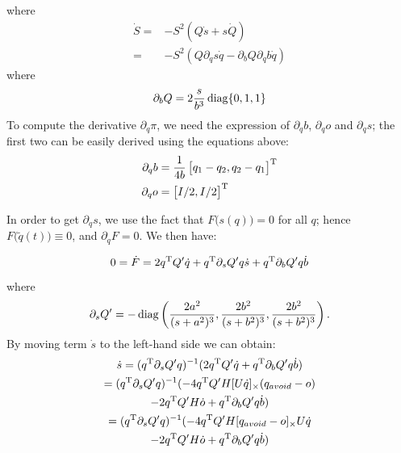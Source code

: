 \documentclass[journal]{IEEEtran}  %
\begin{document}
    where
    \begin{equation}\label{equ:S_dot}
      \begin{split}
        \dot S  =& - S^2 (Q \dot s + s \dot Q)\\
        =& - S^2 (Q \partial_q s \dot q - \partial_b Q \partial_q b \dot q)
      \end{split}
    \end{equation}
    where
    \begin{equation}
      \partial_b Q = 2\frac{s}{b^3} \operatorname{diag}\{0,1,1\}
    \end{equation}
    To compute the derivative $\partial_q \pi$, we need the expression of $\partial_q b$, $\partial_q o$ and $\partial_q s$; the first two can be easily derived using the equations above:
    \begin{align}
      \partial_q b &= \frac{1}{4b}\begin{bmatrix}q_1-q_2,q_2-q_1\end{bmatrix}^\mathrm{T}\\
      \partial_q o &= \begin{bmatrix}I/2,I/2\end{bmatrix}^\mathrm{T}
    \end{align}

    In order to get $\partial_q s$, we use the fact that $F\bigl(s(q)\bigr)=0$ for all $q$; hence $F\bigl(\tilde{q}(t)\bigr)\equiv 0$, and $\partial_q F = 0$. We then have:

    \begin{equation}
      0=\dot F =  2q^\mathrm{T} Q' \dot q + q^\mathrm{T} \partial_s Q' q \dot s + q^\mathrm{T} \partial_bQ' q \dot b
    \end{equation}
    where
    \begin{equation}
      \partial_s Q'= -\operatorname{diag}\left(\frac{2a^2}{(s+a^2)^3},\frac{2b^2}{(s+b^2)^3},\frac{2b^2}{(s+b^2)^3}\right).
    \end{equation}
    By moving term $\dot s$ to the left-hand side we can obtain:
    \begin{multline}\label{equ:s_dot}
      \dot s =  (q^\mathrm{T} \partial_s Q' q)^{-1} (2q^\mathrm{T} Q' \dot q + q^\mathrm{T} \partial_b Q' q \dot b)\\
      =  (q^\mathrm{T} \partial_s Q' q)^{-1} (-4q^\mathrm{T} Q' H[U\dot q]_\times (q_{avoid} - o) \\
      -2q^\mathrm{T} Q'H\dot o + q^\mathrm{T} \partial_b Q' q \dot b)\\
      =  (q^\mathrm{T} \partial_s Q' q)^{-1} (-4q^\mathrm{T} Q' H[q_{avoid} - o]_\times U\dot q \\
      -2q^\mathrm{T} Q'H\dot o + q^\mathrm{T} \partial_b Q' q \dot b)
    \end{multline}
\end{document}
